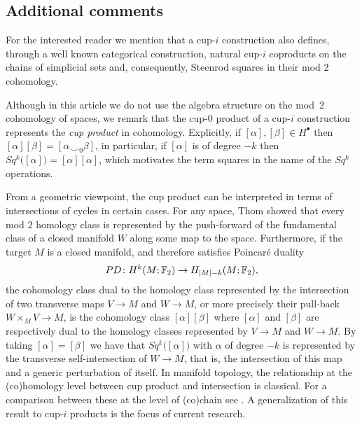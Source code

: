 \subsection{Additional comments}

\begin{remark}
	For the interested reader we mention that a cup-$i$ construction also defines, through a well known categorical construction, natural cup-$i$ coproducts on the chains of simplicial sets \cite{friedman2012simplicial} and, consequently, Steenrod squares in their mod 2 cohomology.
\end{remark}

\begin{remark} \label{r:cup product}
	Although in this article we do not use the algebra structure on the mod~2 cohomology of spaces, we remark that the cup-$0$ product of a cup-$i$ construction represents the \textit{cup product} in cohomology.
	Explicitly, if $[\alpha], [\beta] \in H^\bullet$ then $[\alpha][\beta] = [\alpha \smallsmile_0 \beta]$, in particular, if $[\alpha]$ is of degree $-k$ then $Sq^k\big([\alpha]\big) = [\alpha] [\alpha]$, which motivates the term squares in the name of the $Sq^k$ operations.
\end{remark}

\begin{remark}
	From a geometric viewpoint, the cup product can be interpreted in terms of intersections of cycles in certain cases.
	For any space, Thom showed that every mod $2$ homology class is represented by the push-forward of the fundamental class of a closed manifold $W$ along some map to the space.
	Furthermore, if the target $M$ is a closed manifold, and therefore satisfies Poincar\'{e} duality
	\[
	PD \colon H^k(M ;{\mathbb{F}_2}) \to H_{\lvert M\rvert-k}(M; {\mathbb{F}_2}),
	\]
	the cohomology class dual to the homology class represented by the intersection of two transverse maps $V \to M$ and $W \to M$, or more precisely their pull-back $W \times_M V \to M$, is the cohomology class $[\alpha] [\beta]$ where $[\alpha]$ and $[\beta]$ are respectively dual to the homology classes represented by $V \to M$ and $W \to M$.
	By taking $[\alpha] = [\beta]$ we have that $Sq^k \big( [\alpha] \big)$ with $\alpha$ of degree $-k$ is represented by the transverse self-intersection of $W \to M$, that is, the intersection of this map and a generic perturbation of itself.
	In manifold topology, the relationship at the (co)homology level between cup product and intersection is classical.
	For a comparison between these at the level of (co)chain see \cite{medina2021flowing}.
	A generalization of this result to cup-$i$ products is the focus of current research.
\end{remark}

